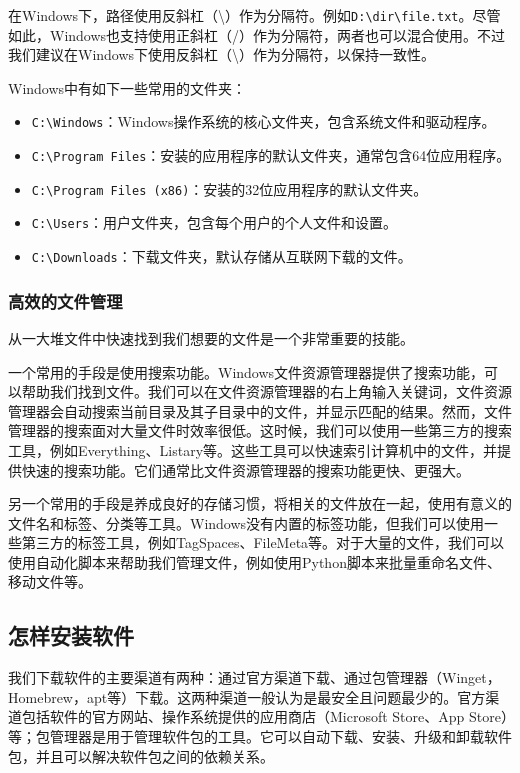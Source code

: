 在Windows下，路径使用反斜杠（\textbackslash）作为分隔符。例如\texttt{D:\textbackslash dir\textbackslash file.txt}。尽管如此，Windows也支持使用正斜杠（/）作为分隔符，两者也可以混合使用。不过我们建议在Windows下使用反斜杠（\textbackslash）作为分隔符，以保持一致性。

Windows中有如下一些常用的文件夹：
\begin{itemize}
  \item \texttt{C:\textbackslash Windows}：Windows操作系统的核心文件夹，包含系统文件和驱动程序。
  \item \texttt{C:\textbackslash Program Files}：安装的应用程序的默认文件夹，通常包含64位应用程序。
  \item \texttt{C:\textbackslash Program Files (x86)}：安装的32位应用程序的默认文件夹。
  \item \texttt{C:\textbackslash Users}：用户文件夹，包含每个用户的个人文件和设置。
  \item \texttt{C:\textbackslash Downloads}：下载文件夹，默认存储从互联网下载的文件。
\end{itemize}

\subsubsection{高效的文件管理}

从一大堆文件中快速找到我们想要的文件是一个非常重要的技能。

一个常用的手段是使用搜索功能。Windows文件资源管理器提供了搜索功能，可以帮助我们找到文件。我们可以在文件资源管理器的右上角输入关键词，文件资源管理器会自动搜索当前目录及其子目录中的文件，并显示匹配的结果。然而，文件管理器的搜索面对大量文件时效率很低。这时候，我们可以使用一些第三方的搜索工具，例如Everything、Listary等。这些工具可以快速索引计算机中的文件，并提供快速的搜索功能。它们通常比文件资源管理器的搜索功能更快、更强大。

另一个常用的手段是养成良好的存储习惯，将相关的文件放在一起，使用有意义的文件名和标签、分类等工具。Windows没有内置的标签功能，但我们可以使用一些第三方的标签工具，例如TagSpaces、FileMeta等。对于大量的文件，我们可以使用自动化脚本来帮助我们管理文件，例如使用Python脚本来批量重命名文件、移动文件等。

\subsection{怎样安装软件}

我们下载软件的主要渠道有两种：通过官方渠道下载、通过包管理器（Winget，Homebrew，apt等）下载。这两种渠道一般认为是最安全且问题最少的。官方渠道包括软件的官方网站、操作系统提供的应用商店（Microsoft Store、App Store）等；包管理器是用于管理软件包的工具。它可以自动下载、安装、升级和卸载软件包，并且可以解决软件包之间的依赖关系。

